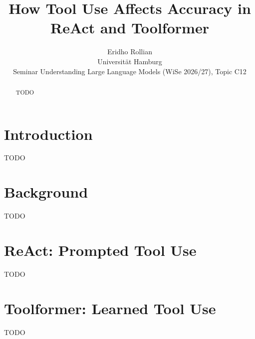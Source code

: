 \documentclass[11pt]{article}
\title{How Tool Use Affects Accuracy in ReAct and Toolformer}
\author{Eridho Rollian \\
  Universität Hamburg \\
  Seminar Understanding Large Language Models (WiSe 2026/27), Topic C12}
\begin{document}
\maketitle

\begin{abstract}
TODO
\end{abstract}

\section{Introduction}
\label{sec:intro}
TODO

\section{Background}
\label{sec:background}
TODO

\section{ReAct: Prompted Tool Use}
\label{sec:react}
TODO

\section{Toolformer: Learned Tool Use}
\label{sec:toolformer}
TODO
\end{document}
